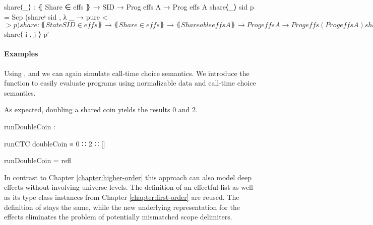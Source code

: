 \begin{code}
share⟨_⟩ : ⦃ Share ∈ effs ⦄ → SID → Prog effs A → Prog effs A
share⟨_⟩ sid p = Scp (shareˢ sid , λ _ → pure <$> p)

share : ⦃ State SID ∈ effs ⦄ → ⦃ Share ∈ effs ⦄ → ⦃ Shareable effs A ⦄ →
  Prog effs A → Prog effs (Prog effs A)
share p = do
    (i , j) ← get
    put (i + 1 , j)
    let p′ = do
          put (i , j + 1)
          x   ← p
          x′  ← shareArgs x
          put (i + 1 , j)
          pure x′
    pure $ share⟨ i , j ⟩ p′
\end{code}

\paragraph{Examples}
Using ,  and  we
can again simulate call-time choice semantics.
We introduce the function  to easily evaluate programs
using normalizable data and call-time choice semantics.

As expected, doubling a shared coin yields the results $0$ and $2$.
\begin{center}
\begin{code}
runDoubleCoin :
\end{code}
\begin{code}[inline]
 runCTC doubleCoin ≡ 0 ∷ 2 ∷ []
\end{code}
\begin{code}
runDoubleCoin = refl
\end{code}
\end{center}
In contrast to Chapter \ref{chapter:higher-order} this approach can also model
deep effects without involving universe levels.
The definition of an effectful list as well as its type class instances from
Chapter \ref{chapter:first-order} are reused.
The definition of  stays the same, while the new
underlying representation for the effects eliminates the problem of potentially
mismatched scope delimiters.

